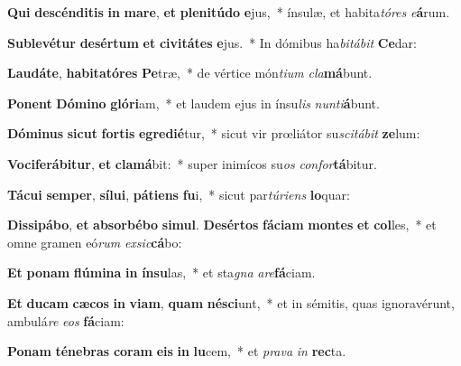 \item \textbf{Qui} \textbf{de}\textbf{scén}\textbf{di}\textbf{tis} \textbf{in} \textbf{ma}\textbf{re}, \textbf{et} \textbf{ple}\textbf{ni}\textbf{tú}\textbf{do} \textbf{e}jus,~* ínsulæ, et habita\textit{tó}\textit{res} \textit{e}\textbf{á}rum.
\item \textbf{Sub}\textbf{le}\textbf{vé}\textbf{tur} \textbf{de}\textbf{sér}\textbf{tum} \textbf{et} \textbf{ci}\textbf{vi}\textbf{tá}\textbf{tes} \textbf{e}jus.~* In dómibus ha\textit{bi}\textit{tá}\textit{bit} \textbf{Ce}dar:
\item \textbf{Lau}\textbf{dá}\textbf{te}, \textbf{ha}\textbf{bi}\textbf{ta}\textbf{tó}\textbf{res} \textbf{Pe}træ,~* de vértice món\textit{ti}\textit{um} \textit{cla}\textbf{má}bunt.
\item \textbf{Po}\textbf{nent} \textbf{Dó}\textbf{mi}\textbf{no} \textbf{gló}\textbf{ri}am,~* et laudem ejus in ínsu\textit{lis} \textit{nun}\textit{ti}\textbf{á}bunt.
\item \textbf{Dó}\textbf{mi}\textbf{nus} \textbf{sic}\textbf{ut} \textbf{for}\textbf{tis} \textbf{e}\textbf{gre}\textbf{di}\textbf{é}tur,~* sicut vir prœliátor su\textit{sci}\textit{tá}\textit{bit} \textbf{ze}lum:
\item \textbf{Vo}\textbf{ci}\textbf{fe}\textbf{rá}\textbf{bi}\textbf{tur}, \textbf{et} \textbf{cla}\textbf{má}bit:~* super inimícos su\textit{os} \textit{con}\textit{for}\textbf{tá}bitur.
\item \textbf{Tá}\textbf{cu}\textbf{i} \textbf{sem}\textbf{per}, \textbf{sí}\textbf{lu}\textbf{i}, \textbf{pá}\textbf{ti}\textbf{ens} \textbf{fu}i,~* sicut par\textit{tú}\textit{ri}\textit{ens} \textbf{lo}quar:
\item \textbf{Dis}\textbf{si}\textbf{pá}\textbf{bo}, \textbf{et} \textbf{ab}\textbf{sor}\textbf{bé}\textbf{bo} \textbf{si}\textbf{mul}. \textbf{De}\textbf{sér}\textbf{tos} \textbf{fá}\textbf{ci}\textbf{am} \textbf{mon}\textbf{tes} \textbf{et} \textbf{col}les,~* et omne gramen eó\textit{rum} \textit{ex}\textit{sic}\textbf{cá}bo:
\item \textbf{Et} \textbf{po}\textbf{nam} \textbf{flú}\textbf{mi}\textbf{na} \textbf{in} \textbf{ín}\textbf{su}las,~* et sta\textit{gna} \textit{a}\textit{re}\textbf{fá}ciam.
\item \textbf{Et} \textbf{du}\textbf{cam} \textbf{cæ}\textbf{cos} \textbf{in} \textbf{vi}\textbf{am}, \textbf{quam} \textbf{né}\textbf{sci}unt,~* et in sémitis, quas ignoravérunt, ambulá\textit{re} \textit{e}\textit{os} \textbf{fá}ciam:
\item \textbf{Po}\textbf{nam} \textbf{té}\textbf{ne}\textbf{bras} \textbf{co}\textbf{ram} \textbf{e}\textbf{is} \textbf{in} \textbf{lu}cem,~* et \textit{pra}\textit{va} \textit{in} \textbf{rec}ta.
